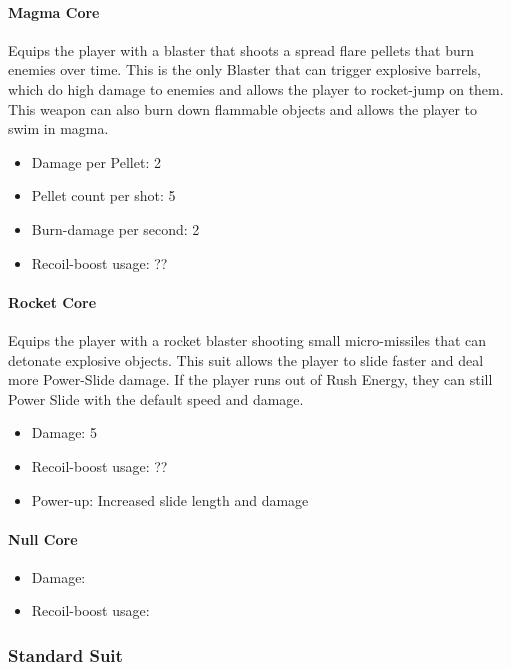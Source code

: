 \documentclass[12pt]{article}
\begin{document}
\paragraph{Magma Core}

Equips the player with a blaster that shoots a spread flare pellets that burn enemies over time. This is the only Blaster that can trigger explosive barrels, which do high damage to enemies and allows the player to rocket-jump on them. This weapon can also burn down flammable objects and allows the player to swim in magma.  

\begin{itemize}
	\item Damage per Pellet: 2
	\item Pellet count per shot: 5
	\item Burn-damage per second: 2
	\item Recoil-boost usage: ??
\end{itemize} 

\paragraph{Rocket Core}

Equips the player with a rocket blaster shooting small micro-missiles that can detonate explosive objects. This suit allows the player to slide faster and deal more Power-Slide damage. If the player runs out of Rush Energy, they can still Power Slide with the default speed and damage.

\begin{itemize}
	\item Damage: 5
	\item Recoil-boost usage: ??
	\item Power-up: Increased slide length and damage
\end{itemize} 

\paragraph{Null Core}

\begin{itemize}
	\item Damage: 
	\item Recoil-boost usage:
\end{itemize}

\subsubsection{Standard Suit}
\end{document}
